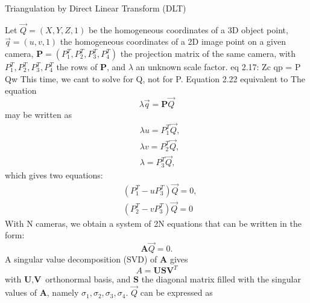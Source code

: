 \begin{algorithm}[!ht]
      \caption{Triangulation by Direct Linear Transform (DLT)}\label{alg:dlt}
      \begin{algorithmic}[1]
          \STATEx Let \(\overrightarrow{Q} = (X, Y, Z, 1)\) be the homogeneous coordinates of a 3D object point, 
          \STATEx \(\overrightarrow{q} = (u, v, 1)\) the homogeneous coordinates of a 2D image point on a given camera,
          \STATEx \(\textbf{P} = (P_1^T, P_2^T, P_3^T, P_4^T)\) the projection matrix of the same camera, with \(P_1^T, P_2^T, P_3^T, P_4^T\) the rows of \textbf{P}, and \(\lambda\) an unknown scale factor. 
          eq 2.17: Zc qp = P Qw
          This time, we cant to solve for Q, not for P. Equation 2.22 equivalent to 
          \STATE The equation
            \begin{equation}
              \lambda \overrightarrow{q} = \bm{P} \overrightarrow{Q}
            \end{equation}
            may be written as
            \begin{equation}
              \begin{aligned}
              &\lambda u = P_1^T \overrightarrow{Q},\\
              &\lambda v = P_2^T \overrightarrow{Q},\\
              &\lambda = P_3^T \overrightarrow{Q},
              \end{aligned}
            \end{equation}
            which gives two equations:
            \begin{equation}\label{eq:dlt}
              \begin{aligned}
              &(P_1^T - u P_3^T) \overrightarrow{Q} = 0,\\
              &(P_2^T - v P_3^T) \overrightarrow{Q} = 0
              \end{aligned}
            \end{equation}
      \STATE With N cameras, we obtain a system of 2N equations that can be written in the form:
      \begin{equation}
        \textbf{A} \overrightarrow{Q} = 0.
      \end{equation}
      \STATE A singular value decomposition (SVD) of \textbf{A} gives 
      \begin{equation}
        A = \textbf{U} \textbf{S} \textbf{V}^T
      \end{equation}
      with \(\textbf{U}, \textbf{V}\) orthonormal basis, and \(\textbf{S}\) the diagonal matrix filled with the singular values of \textbf{A}, namely \(\sigma_1, \sigma_2, \sigma_3, \sigma_4\). \(\overrightarrow{Q}\) can be expressed as 

\end{algorithmic}
\end{algorithm}
